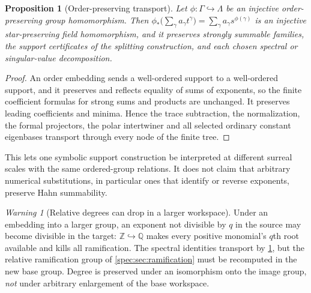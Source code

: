 \documentclass[11pt,a4paper]{article}
\numberwithin{equation}{section}
\newtheorem{proposition}[proposition]{Proposition}
\theoremstyle{definition}
\theoremstyle{remark}
\newtheorem{warning}[warning]{Warning}
\newcommand{\Q}{\mathbb Q}
\newcommand{\Z}{\mathbb Z}
\begin{document}
\begin{proposition}[Order-preserving transport]\label{spec:prop:transport}
Let $\phi:\Gamma\hookrightarrow\Lambda$ be an injective order-preserving
group homomorphism. Then
$\phi_*\bigl(\sum_\gamma a_\gamma t^\gamma\bigr)
 =\sum_\gamma a_\gamma s^{\phi(\gamma)}$
is an injective star-preserving field homomorphism, and it preserves
strongly summable families, the support certificates of the splitting
construction, and each chosen spectral or singular-value decomposition.
\end{proposition}
\begin{proof}
An order embedding sends a well-ordered support to a well-ordered support,
and it preserves and reflects equality of sums of exponents, so the finite
coefficient formulas for strong sums and products are unchanged. It
preserves leading coefficients and minima. Hence the trace subtraction, the
normalization, the formal projectors, the polar intertwiner and all selected
ordinary constant eigenbases transport through every node of the finite
tree.
\end{proof}

This lets one symbolic support construction be interpreted at different
surreal scales with the same ordered-group relations. It does not claim that
arbitrary numerical substitutions, in particular ones that identify or
reverse exponents, preserve Hahn summability.

\begin{warning}[Relative degrees can drop in a larger workspace]\label{spec:warn:degreedrop}
Under an embedding into a larger group, an exponent not divisible by $q$ in
the source may become divisible in the target: $\Z\hookrightarrow\Q$ makes
every positive monomial's $q$th root available and kills all ramification.
The spectral identities transport by \cref{spec:prop:transport}, but the
relative ramification group of \cref{spec:sec:ramification} must be
recomputed in the new base group. Degree is preserved under an isomorphism
onto the image group, \emph{not} under arbitrary enlargement of the base
workspace.
\end{warning}
\end{document}
